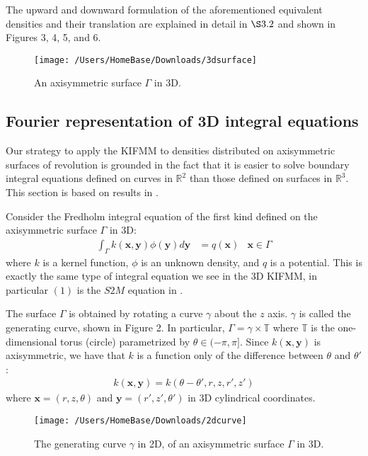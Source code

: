 \documentclass[12pt,letterpaper]{article}
\begin{document}
The upward and downward formulation of the aforementioned equivalent densities and their translation are explained in detail in $\S3.2$ and shown in Figures 3, 4, 5, and 6.

\begin{figure}[!ht]
\begin{center}
\texttt{[image: /Users/HomeBase/Downloads/3dsurface]}
\end{center}
\caption{An axisymmetric surface $\Gamma$ in 3D.}
\end{figure}

\subsection{Fourier representation of 3D integral equations}
Our strategy to apply the KIFMM to densities distributed on axisymmetric surfaces of revolution is grounded in the fact that it is easier to solve boundary integral equations defined on curves in $\mathbb{R}^2$ than those defined on surfaces in $\mathbb{R}^3$. This section is based on results in \cite{YYM}.

Consider the Fredholm integral equation of the first kind defined on the axisymmetric surface $\Gamma$ in 3D:
\begin{align}
\int_\Gamma k(\mathbf{x},\mathbf{y})\phi(\mathbf{y})d\mathbf{y} &= q(\mathbf{x}) &\mathbf{x}\in\Gamma
\end{align}
where $k$ is a kernel function, $\phi$ is an unknown density, and $q$ is a potential. This is exactly the same type of integral equation we see in the 3D KIFMM, in particular $(1)$ is the $S2M$ equation in \cite{YBZ}.

The surface $\Gamma$ is obtained by rotating a curve $\gamma$ about the $z$ axis. $\gamma$ is called the generating curve, shown in Figure 2. In particular, $\Gamma=\gamma\times\mathbb{T}$ where $\mathbb{T}$ is the one-dimensional torus (circle) parametrized by $\theta\in(-\pi,\pi]$. Since $k(\mathbf{x},\mathbf{y})$ is axisymmetric, we have that $k$ is a function only of the difference between $\theta$ and $\theta'$:
\begin{align}
k(\mathbf{x},\mathbf{y})=k(\theta-\theta',r,z,r',z')
\end{align}
where $\mathbf{x}=(r,z,\theta)$ and $\mathbf{y}=(r',z',\theta')$  in 3D cylindrical coordinates.

\begin{figure}[!ht]
\begin{center}
\texttt{[image: /Users/HomeBase/Downloads/2dcurve]}
\end{center}
\caption{The generating curve $\gamma$ in 2D, of an axisymmetric surface $\Gamma$ in 3D.}
\end{figure}
\end{document}
